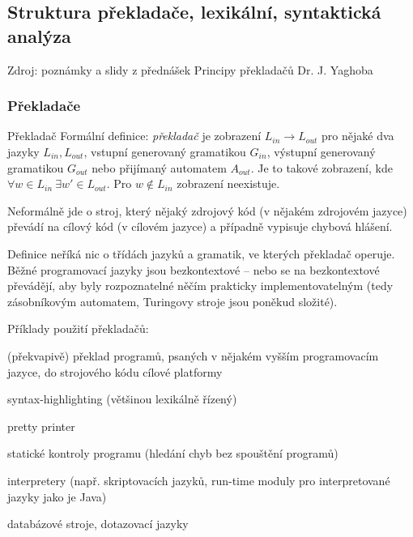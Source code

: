 \subsection{Struktura překladače, lexikální, syntaktická analýza}

Zdroj: poznámky a slidy z přednášek Principy překladačů Dr. J. Yaghoba

\subsubsection*{Překladače}

\begin{definiceN}{Překladač}
Formální definice: \emph{překladač} je zobrazení $L_{in}\to L_{out}$ pro nějaké dva jazyky $L_{in},L_{out}$, vstupní generovaný gramatikou $G_{in}$, výstupní generovaný gramatikou $G_{out}$ nebo přijímaný automatem $A_{out}$. Je to takové zobrazení, kde $\forall w\in L_{in}\ \exists w'\in L_{out}$. Pro $w\notin L_{in}$ zobrazení neexistuje.

Neformálně jde o stroj, který nějaký zdrojový kód (v nějakém zdrojovém jazyce) převádí na cílový kód (v cílovém jazyce) a případně vypisuje chybová hlášení.

Definice neříká nic o třídách jazyků a gramatik, ve kterých překladač operuje. Běžné programovací jazyky jsou  bezkontextové -- nebo se na bezkontextové převádějí, aby byly rozpoznatelné něčím prakticky implementovatelným (tedy zásobníkovým automatem, Turingovy stroje jsou poněkud složité).
\end{definiceN}


\begin{priklady}
Příklady použití překladačů:
\begin{pitemize}
    \item (překvapivě) překlad programů, psaných v nějakém vyšším programovacím jazyce, do strojového kódu cílové platformy
    \item syntax-highlighting (většinou lexikálně řízený)
    \item pretty printer
    \item statické kontroly programu (hledání chyb bez spouštění programů)
    \item interpretery (např. skriptovacích jazyků, run-time moduly pro interpretované jazyky jako je Java)
    \item databázové stroje, dotazovací jazyky
\end{pitemize}
\end{priklady}


